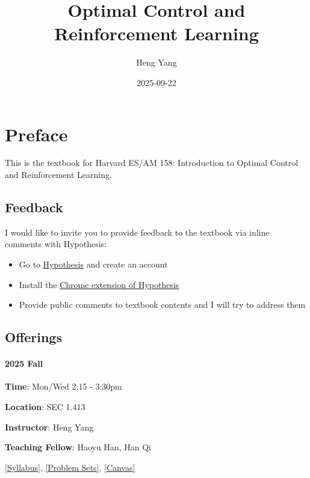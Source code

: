 \documentclass[
]{book}
\title{Optimal Control and Reinforcement Learning}
\author{Heng Yang}
\date{2025-09-22}
\theoremstyle{definition}
\theoremstyle{definition}
\theoremstyle{definition}
\theoremstyle{definition}
\theoremstyle{remark}
\begin{document}
\maketitle

{
\setcounter{tocdepth}{1}
\tableofcontents
}
\chapter*{Preface}\label{preface}

This is the textbook for Harvard ES/AM 158: Introduction to Optimal Control and Reinforcement Learning.

\section*{Feedback}\label{feedback}

I would like to invite you to provide feedback to the textbook via inline comments with Hypothesis:

\begin{itemize}
\item
  Go to \href{https://hypothes.is}{Hypothesis} and create an account
\item
  Install the \href{https://chrome.google.com/webstore/detail/hypothesis-web-pdf-annota/bjfhmglciegochdpefhhlphglcehbmek}{Chrome extension of Hypothesis}
\item
  Provide public comments to textbook contents and I will try to address them
\end{itemize}

\section*{Offerings}\label{offerings}

\subsubsection*{2025 Fall}\label{fall}

\textbf{Time}: Mon/Wed 2:15 - 3:30pm

\textbf{Location}: SEC 1.413

\textbf{Instructor}: Heng Yang

\textbf{Teaching Fellow}: Haoyu Han, Han Qi

\href{https://docs.google.com/document/d/1dIRYQZZJDx8K2q1TrodDDLg-bKJWWmj7o7yzOGlIs7o/edit?usp=sharing}{{[}Syllabus{]}}, \href{https://github.com/ComputationalRobotics/2025-ES-AM-158-PSET}{{[}Problem Sets{]}}, \href{https://canvas.harvard.edu/courses/153422}{{[}Canvas{]}}
\end{document}
